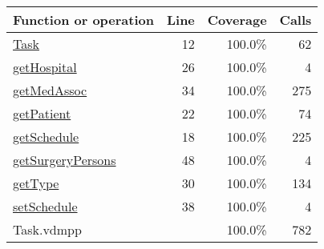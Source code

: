 \begin{longtable}{|l|r|r|r|}
\hline
Function or operation & Line & Coverage & Calls \\
\hline
\hline
\hyperref[Task:12]{Task} & 12&100.0\% & 62 \\
\hline
\hyperref[getHospital:26]{getHospital} & 26&100.0\% & 4 \\
\hline
\hyperref[getMedAssoc:34]{getMedAssoc} & 34&100.0\% & 275 \\
\hline
\hyperref[getPatient:22]{getPatient} & 22&100.0\% & 74 \\
\hline
\hyperref[getSchedule:18]{getSchedule} & 18&100.0\% & 225 \\
\hline
\hyperref[getSurgeryPersons:48]{getSurgeryPersons} & 48&100.0\% & 4 \\
\hline
\hyperref[getType:30]{getType} & 30&100.0\% & 134 \\
\hline
\hyperref[setSchedule:38]{setSchedule} & 38&100.0\% & 4 \\
\hline
\hline
Task.vdmpp & & 100.0\% & 782 \\
\hline
\end{longtable}

